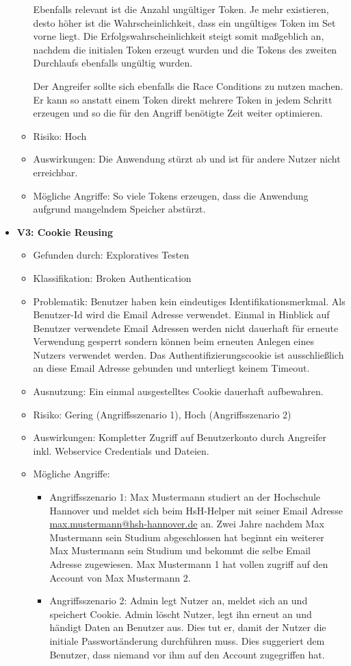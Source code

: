 \documentclass[12pt,DIV14,BCOR10mm,a4paper,parskip=half-,headsepline,headinclude,english,ngerman,bibliography=totocnumbered]{scrreprt}
\begin{document}
\begin{itemize}
\begin{itemize}
  Ebenfalls relevant ist die Anzahl ungültiger Token. Je mehr existieren, desto höher ist die Wahrscheinlichkeit, dass ein ungültiges Token im Set vorne liegt. Die Erfolgswahrscheinlichkeit steigt somit maßgeblich an, nachdem die initialen Token erzeugt wurden und die Tokens des zweiten Durchlaufs ebenfalls ungültig wurden.

  Der Angreifer sollte sich ebenfalls die Race Conditions zu nutzen machen. Er kann so anstatt einem Token direkt mehrere Token in jedem Schritt erzeugen und so die für den Angriff benötigte Zeit weiter optimieren.
  \item Risiko: Hoch
  \item Auswirkungen: Die Anwendung stürzt ab und ist für andere Nutzer nicht erreichbar.
  \item Mögliche Angriffe: So viele Tokens erzeugen, dass die Anwendung aufgrund mangelndem Speicher abstürzt.
  \end{itemize}

  \hypertarget{vulnerability3}{}
  \item \textbf{V3: Cookie Reusing}
  \begin{itemize}
  \item Gefunden durch: Exploratives Testen
  \item Klassifikation: Broken Authentication
  \item Problematik: Benutzer haben kein eindeutiges Identifikationsmerkmal. Als Benutzer-Id wird die Email Adresse verwendet. Einmal in Hinblick auf Benutzer verwendete Email Adressen werden nicht dauerhaft für erneute Verwendung gesperrt sondern können beim erneuten Anlegen eines Nutzers verwendet werden. Das Authentifizierungscookie ist ausschließlich an diese Email Adresse gebunden und unterliegt keinem Timeout.
  \item Ausnutzung: Ein einmal ausgestelltes Cookie dauerhaft aufbewahren.
  \item Risiko: Gering (Angriffsszenario 1), Hoch (Angriffsszenario 2)
  \item Auswirkungen: Kompletter Zugriff auf Benutzerkonto durch Angreifer inkl. Webservice Credentials und Dateien.
  \item Mögliche Angriffe:
  	\begin{itemize}
  		\item Angriffsszenario 1: Max Mustermann studiert an der Hochschule Hannover und meldet sich beim HsH-Helper mit seiner Email Adresse \url{max.mustermann@hsh-hannover.de} an. Zwei Jahre nachdem Max Mustermann sein Studium abgeschlossen hat beginnt ein weiterer Max Mustermann sein Studium und bekommt die selbe Email Adresse zugewiesen. Max Mustermann 1 hat vollen zugriff auf den Account von Max Mustermann 2.
  		\item Angriffsszenario 2: Admin legt Nutzer an, meldet sich an und speichert Cookie. Admin löscht Nutzer, legt ihn erneut an und händigt Daten an Benutzer aus. Dies tut er, damit der Nutzer die initiale Passwortänderung durchführen muss. Dies suggeriert dem Benutzer, dass niemand vor ihm auf den Account zugegriffen hat.
  	\end{itemize}


\end{itemize}
\end{itemize}
\end{document}
